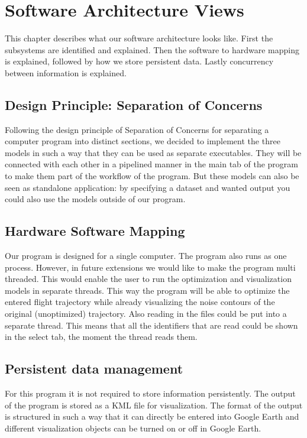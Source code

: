 \section{Software Architecture Views}
This chapter describes what our software architecture looks like. First the subsystems are identified and explained. Then the software to hardware mapping is explained, followed by how we store persistent data. Lastly concurrency between information is explained.

\subsection{Design Principle: Separation of Concerns}
Following the design principle of Separation of Concerns for separating a computer program into distinct sections, we decided to implement the three models in such a way that they can be used as separate executables. They will be connected with each other in a pipelined manner in the main tab of the program to make them part of the workflow of the program. But these models can also be seen as standalone application: by specifying a dataset and wanted output you could also use the models outside of our program.
 
\subsection{Hardware Software Mapping}

Our program is designed for a single computer. The program also runs as one process. However, in future extensions we would like to make the program multi threaded. This would enable the user to run the optimization and visualization models in separate threads. This way the program will be able to optimize the entered flight trajectory while already visualizing the noise contours of the original (unoptimized) trajectory.
Also reading in the files could be put into a separate thread. This means that all the identifiers that are read could be shown in the select tab, the moment the thread reads them.

\subsection{Persistent data management}

For this program it is not required to store information persistently. The output of the program is stored as a KML file for visualization. The format of the output is structured in such a way that it can directly be entered into Google Earth and different visualization objects can be turned on or off in Google Earth.

